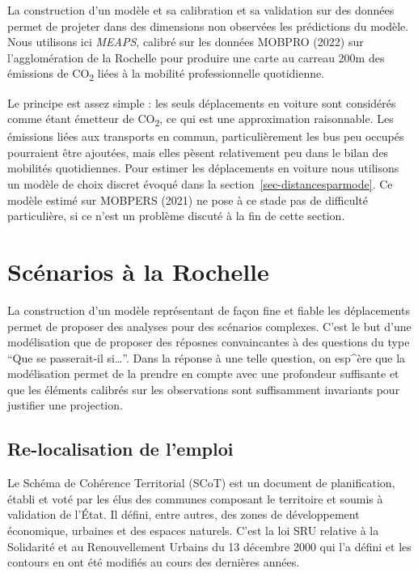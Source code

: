 \documentclass[
  10pt,
  a4paper,
  numbers=noendperiod,
  DIV=9]{scrreprt}
\begin{document}
La construction d'un modèle et sa calibration et sa validation sur des
données permet de projeter dans des dimensions non observées les
prédictions du modèle. Nous utilisons ici \emph{MEAPS}, calibré sur les
données MOBPRO (2022) sur l'agglomération de la Rochelle pour produire
une carte au carreau 200m des émissions de CO\textsubscript{2} liées à
la mobilité professionnelle quotidienne.

Le principe est assez simple : les seuls déplacements en voiture sont
considérés comme étant émetteur de CO\textsubscript{2}, ce qui est une
approximation raisonnable. Les émissions liées aux transports en commun,
particulièrement les bus peu occupés pourraient être ajoutées, mais
elles pèsent relativement peu dans le bilan des mobilités quotidiennes.
Pour estimer les déplacements en voiture nous utilisons un modèle de
choix discret évoqué dans la section~\ref{sec-distancesparmode}. Ce
modèle estimé sur MOBPERS (2021) ne pose à ce stade pas de difficulté
particulière, si ce n'est un problème discuté à la fin de cette section.


\hypertarget{sec-scenarios}{%
\chapter{Scénarios à la Rochelle}\label{sec-scenarios}}

La construction d'un modèle représentant de façon fine et fiable les
déplacements permet de proposer des analyses pour des scénarios
complexes. C'est le but d'une modélisation que de proposer des réposnes
convaincantes à des questions du type ``Que se passerait-il
si\ldots{}''. Dans la réponse à une telle question, on esp\^{}ère que la
modélisation permet de la prendre en compte avec une profondeur
suffisante et que les éléments calibrés sur les observations sont
suffisamment invariants pour justifier une projection.

\hypertarget{re-localisation-de-lemploi}{%
\section{Re-localisation de l'emploi}\label{re-localisation-de-lemploi}}

Le Schéma de Cohérence Territorial (SCoT) est un document de
planification, établi et voté par les élus des communes composant le
territoire et soumis à validation de l'État. Il défini, entre autres,
des zones de développement économique, urbaines et des espaces naturels.
C'est la loi SRU relative à la Solidarité et au Renouvellement Urbains
du 13 décembre 2000 qui l'a défini et les contours en ont été modifiés
au cours des dernières années.
\end{document}
